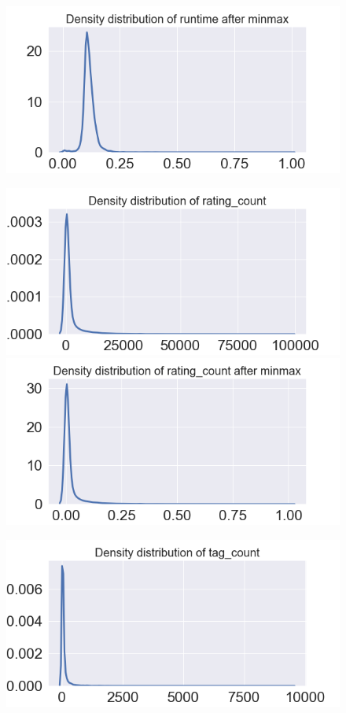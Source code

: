 \documentclass[../main]{subfiles}
\begin{document}
\begin{figure}[htb]
\begin{minipage}[t]{.19\linewidth}
        \includegraphics[width=\linewidth]{figures/minmax_runtime.png}
    \end{minipage}
    \begin{minipage}[t]{.19\linewidth}
        \centering
        \includegraphics[width=\linewidth]{figures/original_rating_count.png}
        \includegraphics[width=\linewidth]{figures/minmax_rating_count.png}
    \end{minipage}  
    \begin{minipage}[t]{.19\linewidth}
        \centering
        \includegraphics[width=\linewidth]{figures/original_tag_count.png}

\end{minipage}
\end{figure}
\end{document}
